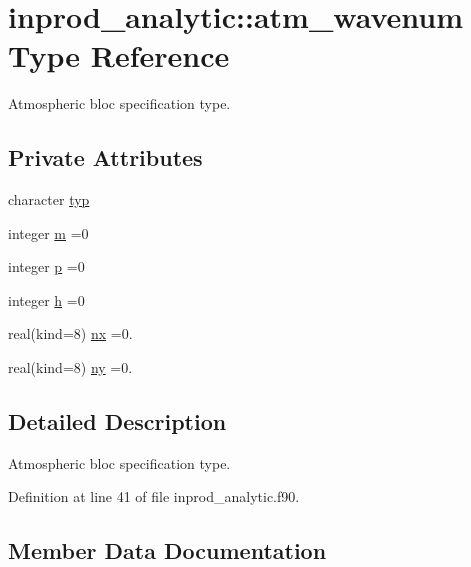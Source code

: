 \hypertarget{structinprod__analytic_1_1atm__wavenum}{}\section{inprod\+\_\+analytic\+:\+:atm\+\_\+wavenum Type Reference}
\label{structinprod__analytic_1_1atm__wavenum}


Atmospheric bloc specification type.  


\subsection*{Private Attributes}
\begin{DoxyCompactItemize}
\item 
character \hyperlink{structinprod__analytic_1_1atm__wavenum_a1c12be211e96c5a773aae4c2146a3792}{typ}
\item 
integer \hyperlink{structinprod__analytic_1_1atm__wavenum_a72be0a86c5f5801b88ebf78506523bd2}{m} =0
\item 
integer \hyperlink{structinprod__analytic_1_1atm__wavenum_a5a938641d8939931bc4eb71499298a6a}{p} =0
\item 
integer \hyperlink{structinprod__analytic_1_1atm__wavenum_aa7df1690e97e43365ca0c2b1222924b5}{h} =0
\item 
real(kind=8) \hyperlink{structinprod__analytic_1_1atm__wavenum_ad67bf9989f5524b1f97dc7211ef78db2}{nx} =0.
\item 
real(kind=8) \hyperlink{structinprod__analytic_1_1atm__wavenum_af75974631175c67689c588f6d92ceb3e}{ny} =0.
\end{DoxyCompactItemize}


\subsection{Detailed Description}
Atmospheric bloc specification type. 

Definition at line 41 of file inprod\+\_\+analytic.\+f90.



\subsection{Member Data Documentation}
